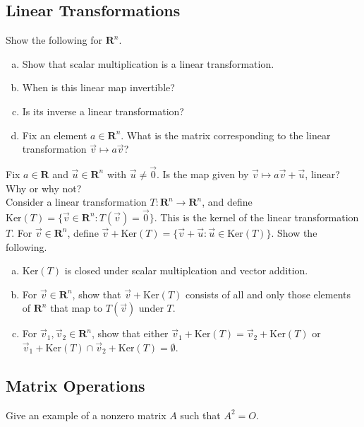 \documentclass[a4paper,11pt]{article}
\newcommand{\R}{\mathbf{R}}
\begin{document}
\subsection*{Linear Transformations}

 Show the following for $\R^n$.
\begin{enumerate}[(a)]
\item Show that scalar multiplication is a linear transformation.
\item When is this linear map invertible?
\item Is its inverse a linear transformation?
\item Fix an element $a \in \R^n$. What is the matrix corresponding to the
linear transformation $\vec v \mapsto a\vec v$? \\
\end{enumerate}

 Fix $a \in \R$ and $\vec u \in \R^n$ with $\vec
u \neq \vec 0$. Is the map given by $\vec v \mapsto a\vec v + \vec u$, linear?
Why or why not? \\

 Consider a linear transformation $T: \R^n
\rightarrow \R^n$, and define $\text{Ker}(T)=\{\vec v \in \R^n : T(\vec v)=\vec
0\}$. This is the kernel of the linear transformation $T$. For $\vec v \in
\R^n$, define $\vec v + \text{Ker}(T)=\{\vec v + \vec u : \vec u \in
\text{Ker}(T)\}$. Show the following.
\begin{enumerate}[(a)]
\item $\text{Ker}(T)$ is closed under scalar multiplcation and vector addition.
\item For $\vec v \in \R^n$, show that $\vec v + \text{Ker}(T)$ consists of all
  and only those elements of $\R^n$ that map to $T(\vec v)$ under $T$.
\item For $\vec v_1,\vec v_2 \in \R^n$, show that either $\vec
  v_1+\text{Ker}(T)=\vec v_2 +\text{Ker}(T)$ or $\vec v_1+\text{Ker}(T) \cap
  \vec v_2 +\text{Ker}(T)=\emptyset$.
\end{enumerate}

\subsection*{Matrix Operations}

 Give an example of a nonzero matrix $A$ such
that $A^2=O$. \\
\end{document}

